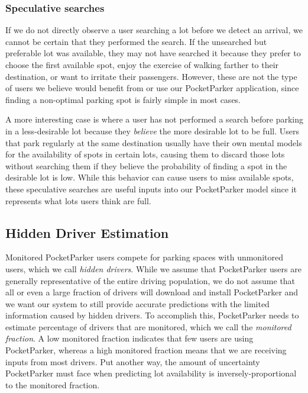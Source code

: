 \subsubsection{Speculative searches}

If we do not directly observe a user searching a lot before we detect an
arrival, we cannot be certain that they performed the search. If the
unsearched but preferable lot was available, they may not have searched it
because they prefer to choose the first available spot, enjoy the exercise of
walking farther to their destination, or want to irritate their passengers.
However, these are not the type of users we believe would benefit from or use
our PocketParker application, since finding a non-optimal parking spot is
fairly simple in most cases.

A more interesting case is where a user has not performed a search before
parking in a less-desirable lot because they \textit{believe} the more
desirable lot to be full. Users that park regularly at the same destination
usually have their own mental models for the availability of spots in certain
lots, causing them to discard those lots without searching them if they
believe the probability of finding a spot in the desirable lot is low. While
this behavior can cause users to miss available spots, these speculative
searches are useful inputs into our PocketParker model since it represents
what lots users think are full.

\subsection{Hidden Driver Estimation}
\label{subsec-hidden}

Monitored PocketParker users compete for parking spaces with unmonitored
users, which we call \textit{hidden drivers}. While we assume that
PocketParker users are generally representative of the entire driving
population, we do not assume that all or even a large fraction of drivers
will download and install PocketParker and we want our system to still
provide accurate predictions with the limited information caused by hidden
drivers. To accomplish this, PocketParker needs to estimate percentage of
drivers that are monitored, which we call the \textit{monitored fraction}. A
low monitored fraction indicates that few users are using PocketParker,
whereas a high monitored fraction means that we are receiving inputs from
most drivers. Put another way, the amount of uncertainty PocketParker must
face when predicting lot availability is inversely-proportional to the
monitored fraction.


